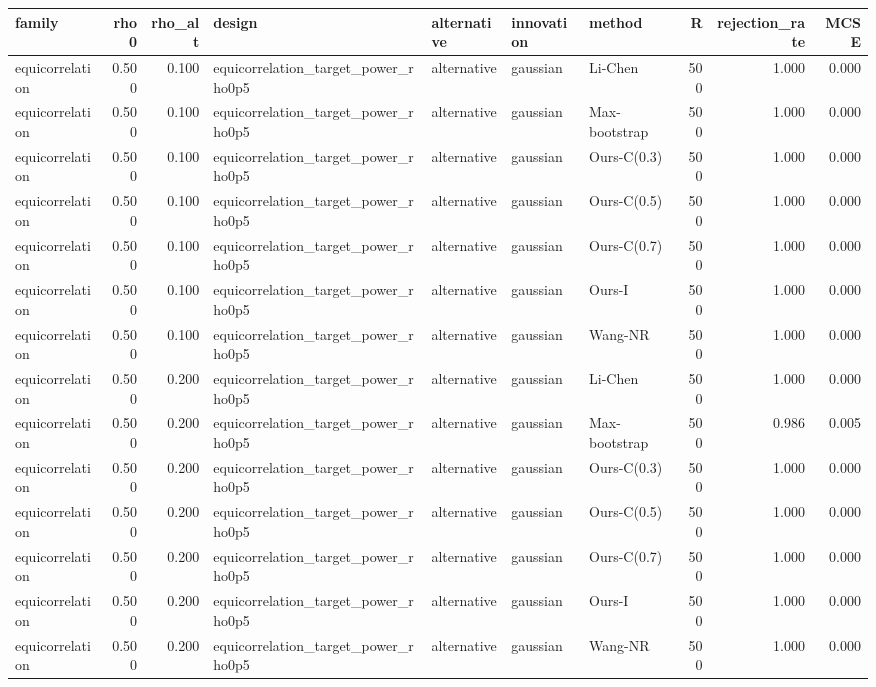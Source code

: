 \begin{tabular}{lrrllllrrr}
\toprule
family & rho0 & rho\_alt & design & alternative & innovation & method & R & rejection\_rate & MCSE \\
\midrule
equicorrelation & 0.500 & 0.100 & equicorrelation\_target\_power\_rho0p5 & alternative & gaussian & Li-Chen & 500 & 1.000 & 0.000 \\
equicorrelation & 0.500 & 0.100 & equicorrelation\_target\_power\_rho0p5 & alternative & gaussian & Max-bootstrap & 500 & 1.000 & 0.000 \\
equicorrelation & 0.500 & 0.100 & equicorrelation\_target\_power\_rho0p5 & alternative & gaussian & Ours-C(0.3) & 500 & 1.000 & 0.000 \\
equicorrelation & 0.500 & 0.100 & equicorrelation\_target\_power\_rho0p5 & alternative & gaussian & Ours-C(0.5) & 500 & 1.000 & 0.000 \\
equicorrelation & 0.500 & 0.100 & equicorrelation\_target\_power\_rho0p5 & alternative & gaussian & Ours-C(0.7) & 500 & 1.000 & 0.000 \\
equicorrelation & 0.500 & 0.100 & equicorrelation\_target\_power\_rho0p5 & alternative & gaussian & Ours-I & 500 & 1.000 & 0.000 \\
equicorrelation & 0.500 & 0.100 & equicorrelation\_target\_power\_rho0p5 & alternative & gaussian & Wang-NR & 500 & 1.000 & 0.000 \\
equicorrelation & 0.500 & 0.200 & equicorrelation\_target\_power\_rho0p5 & alternative & gaussian & Li-Chen & 500 & 1.000 & 0.000 \\
equicorrelation & 0.500 & 0.200 & equicorrelation\_target\_power\_rho0p5 & alternative & gaussian & Max-bootstrap & 500 & 0.986 & 0.005 \\
equicorrelation & 0.500 & 0.200 & equicorrelation\_target\_power\_rho0p5 & alternative & gaussian & Ours-C(0.3) & 500 & 1.000 & 0.000 \\
equicorrelation & 0.500 & 0.200 & equicorrelation\_target\_power\_rho0p5 & alternative & gaussian & Ours-C(0.5) & 500 & 1.000 & 0.000 \\
equicorrelation & 0.500 & 0.200 & equicorrelation\_target\_power\_rho0p5 & alternative & gaussian & Ours-C(0.7) & 500 & 1.000 & 0.000 \\
equicorrelation & 0.500 & 0.200 & equicorrelation\_target\_power\_rho0p5 & alternative & gaussian & Ours-I & 500 & 1.000 & 0.000 \\
equicorrelation & 0.500 & 0.200 & equicorrelation\_target\_power\_rho0p5 & alternative & gaussian & Wang-NR & 500 & 1.000 & 0.000 \\

\end{tabular}
